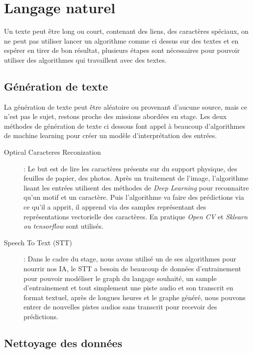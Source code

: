 \section{Langage naturel}

Un texte peut être long ou court, contenant des liens, des caractères spéciaux, on ne peut pas utiliser lancer un algorithme comme ci dessus sur des textes et en espérer en tirer de bon résultat, plusieurs étapes sont nécessaires pour pouvoir utiliser des algorithmes qui travaillent avec des textes. 

\subsection{Génération de texte}
La génération de texte peut être aléatoire ou provenant d'aucune source, mais ce n'est pas le sujet, restons proche des missions abordées en stage. Les deux méthodes de génération de texte ci dessous font appel à beaucoup d'algorithmes de machine learning pour créer un modèle d'interprétation des entrées.

\begin{description}
\item[Optical Caracteres Reconization]: Le but est de lire les caractères présents sur du support physique, des feuilles de papier, des photos. Après un traitement de l'image, l'algorithme lisant les entrées utilisent des méthodes de \textit{Deep Learning} pour reconnaitre qu'un motif et un caractère. Puis l'algorithme va faire des prédictions via ce qu'il a apprit, il apprend via des samples représentant des représentations vectorielle des caractères. En pratique \textit{Open CV} et \textit{Sklearn ou tensorflow} sont utilisés.

\item[Speech To Text (STT)]: Dans le cadre du stage, nous avons utilisé un de ses algorithmes pour nourrir nos IA, le STT a besoin de beaucoup de données d'entrainement pour pouvoir modéliser le graph du langage souhaité, un sample d'entrainement et tout simplement une piste audio et son transcrit en format textuel, après de longues heures et le graphe généré, nous pouvons entrer de nouvelles pistes audios sans transcrit pour recevoir des prédictions.
\end{description}

\pagebreak
\subsection{Nettoyage des données}

